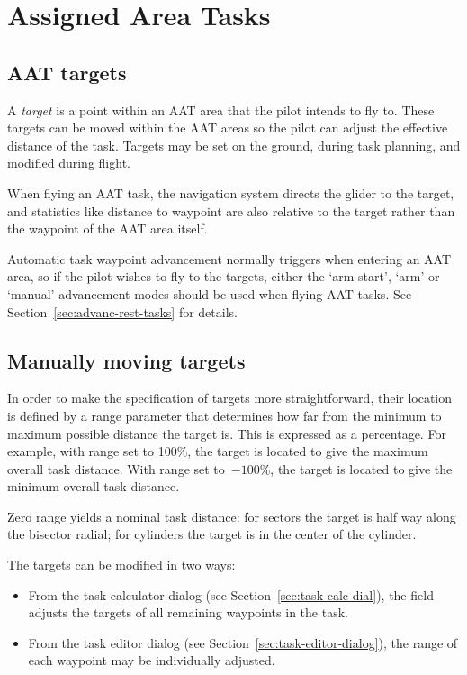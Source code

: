 \documentclass[a4paper,12pt]{refrep}
\begin{document}
\section{Assigned Area Tasks}\label{sec:aat-tasks}

\subsection*{AAT targets}

A {\em target} is a point within an AAT area that the pilot intends to
fly to.  These targets can be moved within the AAT areas so the pilot
can adjust the effective distance of the task.  Targets may be set on
the ground, during task planning, and modified during flight.

When flying an AAT task, the navigation system directs the glider to
the target, and statistics like distance to waypoint are also relative
to the target rather than the waypoint of the AAT area itself.

Automatic task waypoint advancement normally triggers when entering an
AAT area, so if the pilot wishes to fly to the targets, either the
`arm start', `arm' or `manual' advancement modes should be used when
flying AAT tasks.  See Section~\ref{sec:advanc-rest-tasks} for
details.

\subsection*{Manually moving targets}

In order to make the specification of targets more straightforward,
their location is defined by a range parameter that determines how
far from the minimum to maximum possible distance the target is.  This
is expressed as a percentage.  For example, with range set to 100\%,
the target is located to give the maximum overall task distance.  With
range set to~$-100$\%, the target is located to give the minimum overall
task distance.  

Zero range yields a nominal task distance: for sectors the target is
half way along the bisector radial; for cylinders the target is in the
center of the cylinder.

The targets can be modified in two ways:
\begin{itemize}
\item From the task calculator dialog (see 
 Section~\ref{sec:task-calc-dial}), the  field adjusts the
 targets of all remaining waypoints in the task.
\item From the task editor dialog (see 
 Section~\ref{sec:task-editor-dialog}), the range of each waypoint may
 be individually adjusted.
\end{itemize}
\end{document}
